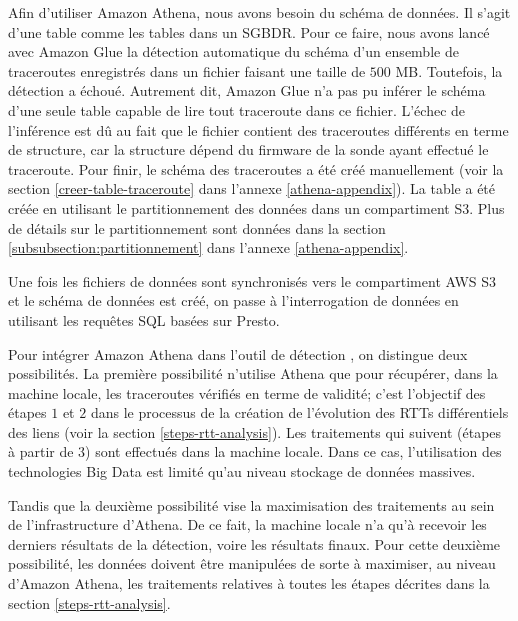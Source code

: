 Afin d'utiliser Amazon Athena, nous avons besoin du schéma de données. Il s'agit d'une table comme les tables dans un SGBDR. Pour ce faire, 
nous avons lancé  avec Amazon Glue  la détection automatique du schéma d'un ensemble de  traceroutes enregistrés dans un fichier faisant une taille de $500$ MB. Toutefois, la détection a échoué. Autrement dit, Amazon Glue n'a pas pu inférer le schéma d'une seule table capable de lire tout traceroute dans ce fichier.  L'échec de l'inférence est dû au fait que le fichier contient des traceroutes différents en terme de structure, car la structure dépend du firmware de la sonde ayant effectué le traceroute.
 Pour finir, le schéma des traceroutes a été créé manuellement (voir la section \ref{creer-table-traceroute} dans l'annexe \ref{athena-appendix}). La table a été créée en utilisant le partitionnement des données dans un compartiment S3. Plus de détails sur le partitionnement sont données dans la section \ref{subsubsection:partitionnement} dans l'annexe \ref{athena-appendix}.


Une fois les fichiers de données sont synchronisés vers le compartiment AWS S3 et le schéma  de données est créé, on passe à l'interrogation de données en utilisant les requêtes SQL basées sur Presto.  

Pour intégrer Amazon Athena dans l'outil de détection \cite{InternetHealthReport}, on distingue deux possibilités. La première possibilité n'utilise Athena que pour récupérer, dans la machine locale,  les traceroutes vérifiés en terme de validité; c'est l'objectif des étapes $1$ et $2$ dans le processus de la création de l'évolution des RTTs différentiels des liens (voir la section \ref{steps-rtt-analysis}).  Les traitements qui suivent (étapes  à partir de $3$) sont effectués dans la machine locale. Dans ce cas, l'utilisation des technologies  Big Data est limité qu'au niveau stockage de données massives. 

Tandis que  la deuxième possibilité vise la maximisation des traitements au sein de l'infrastructure  d'Athena. De ce fait, la machine locale n'a qu'à recevoir les derniers résultats de la détection, voire les résultats finaux. Pour cette deuxième possibilité, les données doivent être manipulées de sorte à maximiser,  	au niveau d'Amazon Athena,  les traitements relatives à toutes les étapes décrites dans la section \ref{steps-rtt-analysis}. 

